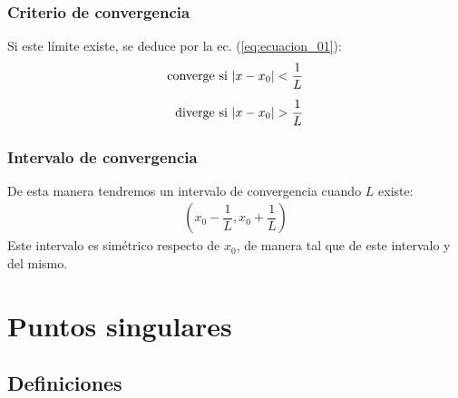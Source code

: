 \documentclass[12pt]{beamer}
\begin{document}
\begin{frame}
\frametitle{Criterio de convergencia}
Si este límite existe, se deduce por la ec. (\ref{eq:ecuacion_01}):
\pause
\begin{align}
\begin{aligned}        
\mbox{converge si } &\abs{x - x_{0}} < \dfrac{1}{L} \\[0.5em]
\mbox{diverge si } &\abs{x - x_{0}} > \dfrac{1}{L}
\end{aligned}
\label{eq:ecuacion_02}    
\end{align}
\end{frame}
\begin{frame}
\frametitle{Intervalo de convergencia}
De esta manera tendremos un intervalo de convergencia cuando $L$ existe:
\pause
\begin{align*}
\left( x_{0} - \dfrac{1}{L}, x_{0} + \dfrac{1}{L} \right)
\end{align*}
\pause
Este intervalo es simétrico respecto de $x_{0}$, de manera tal que  de este intervalo \pause y  del mismo.
\end{frame}

\section{Puntos singulares}
\subsection{Definiciones}
\end{document}
